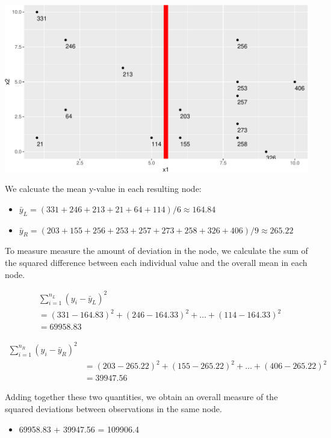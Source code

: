 \documentclass[
  letterpaper,
  DIV=11,
  numbers=noendperiod]{scrreprt}
\providecommand{\tightlist}{%
  \setlength{\itemsep}{0pt}\setlength{\parskip}{0pt}}\usepackage{longtable,booktabs,array}
\begin{document}
\includegraphics{Ch7_files/figure-pdf/unnamed-chunk-52-1.pdf}

We calcuate the mean y-value in each resulting node:

\begin{itemize}
\tightlist
\item
  \(\bar{y}_L = (331+246+213+21+64+114)/6 \approx 164.84\)\\
\item
  \(\bar{y}_R = (203+155+256+253+257+273+258+326+406)/9 \approx 265.22\)
\end{itemize}

To measure measure the amount of deviation in the node, we calculate the
sum of the squared difference between each individual value and the
overall mean in each node.

\[
\begin{aligned}
& \displaystyle\sum_{i=1}^{n_L} (y_i -\bar{y}_L)^2  \\
& =(331-164.83)^2+(246-164.33)^2 + \ldots+(114-164.33)^2 \\
& =69958.83
\end{aligned}
\]

\[
\begin{aligned}
\displaystyle\sum_{i=1}^{n_R} (y_i -\bar{y}_R)^2 \\
& =(203-265.22)^2+(155-265.22)^2 + \ldots+(406-265.22)^2 \\
& =39947.56
\end{aligned}
\]

Adding together these two quantities, we obtain an overall measure of
the squared deviations between observations in the same node.

\begin{itemize}
\tightlist
\item
  69958.83 + 39947.56 = 109906.4
\end{itemize}
\end{document}
